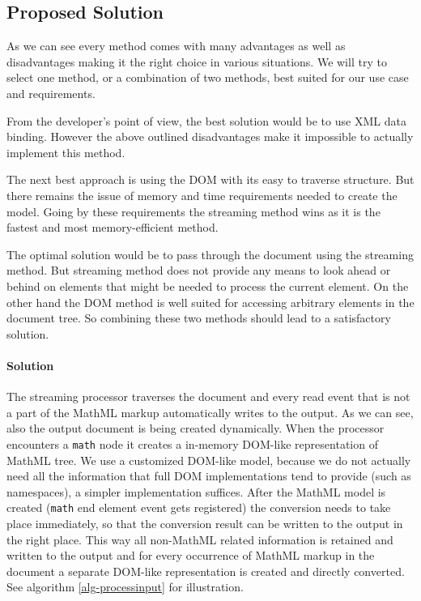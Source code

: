 \documentclass[11pt,oneside,final]{fithesis2}
\begin{document}
\subsection{Proposed Solution}
\label{section:inputProcessingSolution}
As we can see every method comes with many advantages as well as disadvantages making it the right choice in various situations. We will try to select one method, or a combination of two methods, best suited for our use case and requirements. 

From the developer's point of view, the best solution would be to use XML data binding. However the above outlined disadvantages make it impossible to actually implement this method.

The next best approach is using the DOM with its easy to traverse structure. But there remains the issue of memory and time requirements needed to create the model. Going by these requirements the streaming method wins as it is the fastest and most memory-efficient method.

The optimal solution would be to pass through the document using the streaming method. But streaming method does not provide any means to look ahead or behind on elements that might be needed to process the current element. On the other hand the DOM method is well suited for accessing arbitrary elements in the document tree. So combining these two methods should lead to a satisfactory solution. 

\paragraph*{Solution}\label{inputprocessing:solution} The streaming processor traverses the document and every read event that is not a part of the MathML markup automatically writes to the output. As we can see, also the output document is being created dynamically. When the processor encounters a \texttt{math} node it creates a in-memory DOM-like representation of MathML tree. We use a customized DOM-like model, because we do not actually need all the information that full DOM implementations tend to provide (such as namespaces), a simpler implementation suffices. After the MathML model is created (\texttt{math} end element event gets registered) the conversion needs to take place immediately, so that the conversion result can be written to the output in the right place. This way all non-MathML related information is retained and written to the output and for every occurrence of MathML markup in the document a separate DOM-like representation is created and directly converted. See algorithm \ref{alg-processinput} for illustration. 
\end{document}
